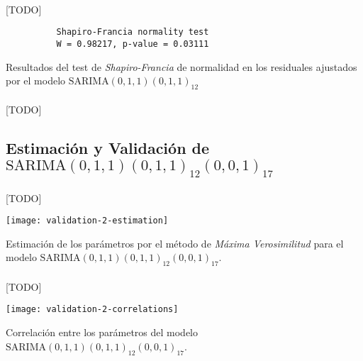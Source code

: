 \documentclass[a4paper, spanish]{article}
\begin{document}
      \paragraph{}
      [TODO]

      \begin{table}
        \begin{Verbatim}
          Shapiro-Francia normality test
          W = 0.98217, p-value = 0.03111
        \end{Verbatim}
        \caption{Resultados del test de \emph{Shapiro-Francia} de normalidad en los residuales ajustados por el modelo $\text{SARIMA}(0, 1, 1)(0, 1, 1)_{12}$}
        \label{result:comparison_1_sf}
      \end{table}

      \paragraph{}
      [TODO]

    \subsection{Estimación y Validación de \textbf{$\text{SARIMA}(0, 1, 1)(0, 1, 1)_{12}(0, 0, 1)_{17}$}}
    \label{sec:fitting_2}

      \paragraph{}
      [TODO]

      \begin{table}[htb!]
        \centering
        \texttt{[image: validation-2-estimation]}
        \caption{Estimación de los parámetros por el método de \emph{Máxima Verosimilitud} para el modelo $\text{SARIMA}(0, 1, 1)(0, 1, 1)_{12}(0, 0, 1)_{17}$.}
        \label{table:validation_2_estimation}
      \end{table}

      \paragraph{}
      [TODO]

      \begin{table}[htb!]
        \centering
        \texttt{[image: validation-2-correlations]}
        \caption{Correlación entre los parámetros del modelo $\text{SARIMA}(0, 1, 1)(0, 1, 1)_{12}(0, 0, 1)_{17}$.}
        \label{table:validation_2_correlations}
      \end{table}
\end{document}
